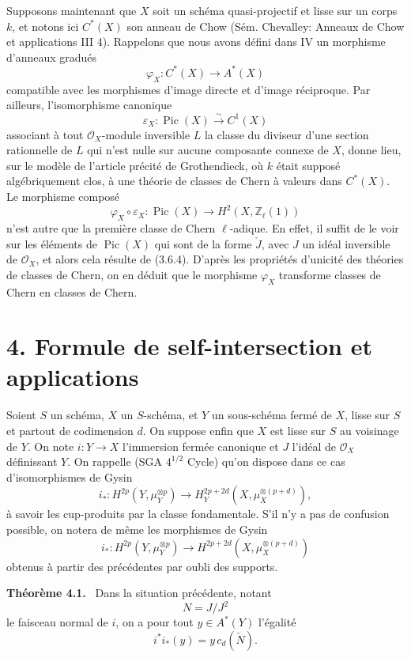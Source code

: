 \documentclass[11pt]{article}
\newenvironment{statement}[1]{\par\medskip\noindent\textbf{#1.}\ }{\par\medskip}
\providecommand{\Pic}{\operatorname{Pic}}
\begin{document}
Supposons maintenant que $X$ soit un schéma quasi-projectif et lisse sur un corps $k$, et notons ici $C^*(X)$ son anneau de Chow (Sém. Chevalley: Anneaux de Chow et applications III 4). Rappelons que nous avons défini dans IV un morphisme d'anneaux gradués
\[
\varphi_X:C^*(X)\to A^*(X)
\]
compatible avec les morphismes d'image directe et d'image réciproque. Par ailleurs, l'isomorphisme canonique
\[
\varepsilon_X:\Pic(X)\xrightarrow{\sim} C^1(X)
\]
associant à tout $\mathcal O_X$-module inversible $L$ la classe du diviseur d'une section rationnelle de $L$ qui n'est nulle sur aucune composante connexe de $X$, donne lieu, sur le modèle de l'article précité de Grothendieck, où $k$ était supposé algébriquement clos, à une théorie de classes de Chern à valeurs dans $C^*(X)$. Le morphisme composé
\[
\varphi_X\circ\varepsilon_X:\Pic(X)\longrightarrow H^2(X,\mathbb Z_\ell(1))
\]
n'est autre que la première classe de Chern $\ell$-adique. En effet, il suffit de le voir sur les éléments de $\Pic(X)$ qui sont de la forme $\check J$, avec $J$ un idéal inversible de $\mathcal O_X$, et alors cela résulte de (3.6.4). D'après les propriétés d'unicité des théories de classes de Chern, on en déduit que le morphisme $\varphi_X$ transforme classes de Chern en classes de Chern.

\section*{4. Formule de self-intersection et applications}

Soient $S$ un schéma, $X$ un $S$-schéma, et $Y$ un sous-schéma fermé de $X$, lisse sur $S$ et partout de codimension $d$. On suppose enfin que $X$ est lisse sur $S$ au voisinage de $Y$. On note $i:Y\to X$ l'immersion fermée canonique et $J$ l'idéal de $\mathcal O_X$ définissant $Y$. On rappelle (SGA $4^{1/2}$ Cycle) qu'on dispose dans ce cas d'isomorphismes de Gysin
\[
i_*:H^{2p}(Y,\mu_Y^{\otimes p})
\to H_Y^{2p+2d}(X,\mu_X^{\otimes(p+d)}),
\]
à savoir les cup-produits par la classe fondamentale. S'il n'y a pas de confusion possible, on notera de même les morphismes de Gysin
\[
i_*:H^{2p}(Y,\mu_Y^{\otimes p})
\to H^{2p+2d}(X,\mu_X^{\otimes(p+d)})
\]
obtenus à partir des précédentes par oubli des supports.

\begin{statement}{Théorème 4.1}
Dans la situation précédente, notant
\[
N=J/J^2
\]
le faisceau normal de $i$, on a pour tout $y\in A^*(Y)$ l'égalité
\[
i^*i_*(y)=y\,c_d(\check N).
\]
\end{statement}
\end{document}

